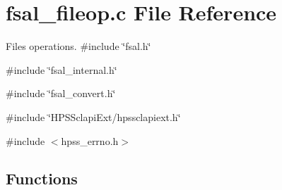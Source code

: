 \section{fsal\_\-fileop.c File Reference}
\label{fsal__fileop_8c}


Files operations.  
{\ttfamily \#include \char`\"{}fsal.h\char`\"{}}\par
{\ttfamily \#include \char`\"{}fsal\_\-internal.h\char`\"{}}\par
{\ttfamily \#include \char`\"{}fsal\_\-convert.h\char`\"{}}\par
{\ttfamily \#include \char`\"{}HPSSclapiExt/hpssclapiext.h\char`\"{}}\par
{\ttfamily \#include $<$hpss\_\-errno.h$>$}\par
\subsection*{Functions}
